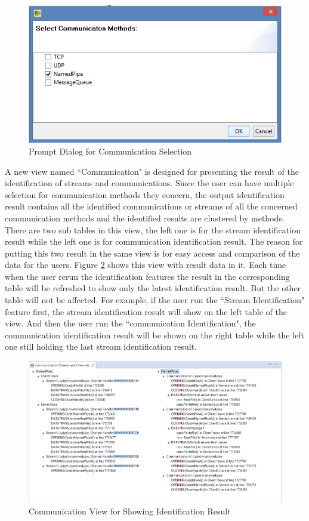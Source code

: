 \begin{figure}[H]
\centerline{\includegraphics[scale=0.8]{Figures/methods}}
 \caption{Prompt Dialog for Communication Selection}
\label{methods}
\end{figure}

A new view named ``Communication" is designed for presenting the result of the identification of streams and communications. Since the user can have multiple selection for communication methods they concern, the output identification result contains all the identified communications or streams of all the concerned communication methods and the identified results are clustered by methods. There are two sub tables in this view, the left one is for the stream identification result while the left one is for communication identification result. The reason for putting this two result in the same view is for easy access and comparison of the data for the users. Figure \ref{idenview} shows this view with result data in it. Each time when the user rerun the identification features the result in the corresponding table will be refreshed to show only the latest identification result. But the other table will not be affected. For example, if the user run the ``Stream Identification" feature first, the stream identification result will show on the left table of the view. And then the user run the ``communication Identification", the communication identification result will be shown on the right table while the left one still holding the last stream identification result.

\begin{figure}[H]
\centerline{\includegraphics[scale=0.7]{Figures/idenview}}
 \caption{Communication View for Showing Identification Result}
\label{idenview}
\end{figure}

